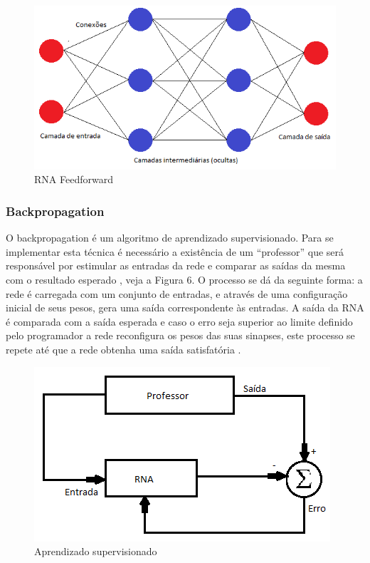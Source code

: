 \begin{figure}[htb]
 \centering
 	\caption{RNA Feedforward}
 	\label{fig:RNA Feedforward}
 	\includegraphics[scale=0.9]{figuras/rede-feedforward.png}
 \end{figure}
 
 \subsubsection{Backpropagation}
 O backpropagation é um algoritmo de aprendizado supervisionado. Para se implementar esta técnica é necessário a existência de um “professor” que será responsável por estimular as entradas da rede  e comparar as saídas da mesma com o resultado esperado \cite{BRAGA}, veja a Figura 6. O processo se dá da seguinte forma: a rede é carregada com um conjunto de entradas, e através de uma configuração inicial de seus pesos, gera uma saída correspondente às entradas. A saída da RNA é comparada com a saída esperada e caso o erro seja superior ao limite definido pelo programador a rede reconfigura os pesos das suas sinapses, este processo se repete até que a rede obtenha uma saída satisfatória \cite{LANHELLAS}.

\begin{figure}[htb]
 \centering
 	\caption{Aprendizado supervisionado}
 	\label{fig:Aprendizado supervisionado}
 	\includegraphics[scale=0.9]{figuras/aprendizado-supervizionado.png}
 \end{figure}

